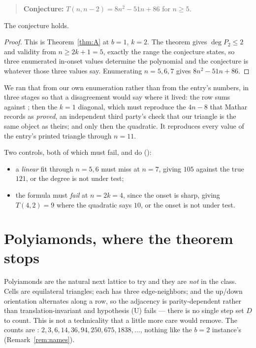 \documentclass[11pt]{article}
\begin{document}
\begin{quote}
\textbf{Conjecture:} $T(n,n-2) = 8n^2 - 51n + 86$ for $n \ge 5$.
\end{quote}

\begin{corollary}
\label{cor:a308359}
The conjecture holds.
\end{corollary}

\begin{proof}
This is Theorem~\ref{thm:A} at $b = 1$, $k = 2$. The theorem gives
$\deg P_2 \le 2$ and validity from $n \ge 2k+1 = 5$, exactly the range the
conjecture states, so three enumerated in-onset values determine the
polynomial and the conjecture is whatever those three values say. Enumerating
$n = 5, 6, 7$ gives $8n^2 - 51n + 86$.
\end{proof}

We ran that from our own enumeration rather than from the entry's numbers, in
three stages so that a disagreement would say where it lived: the row sums
against ; then the $k=1$ diagonal, which must reproduce the
$4n-8$ that Mathar records as \emph{proved}, an independent third party's check
that our triangle is the same object as theirs; and only then the quadratic. It reproduces every value
of the entry's printed triangle through $n = 11$.

Two controls, both of which must fail, and do
():
\begin{itemize}
\item a \emph{linear} fit through $n = 5, 6$ must miss at $n = 7$, giving
  $105$ against the true $121$, or the degree is not under test;
\item the formula must \emph{fail} at $n = 2k = 4$, since the onset is sharp,
  giving $T(4,2) = 9$ where the quadratic says $10$, or the onset is not under
  test.
\end{itemize}

\section{Polyiamonds, where the theorem stops}
\label{sec:polyiamond}

Polyiamonds are the natural next lattice to try and they are \emph{not} in the
class. Cells are equilateral triangles; each has three edge-neighbors; and the
up/down orientation alternates along a row, so the adjacency is parity-dependent
rather than translation-invariant and hypothesis (U) fails --- there is no single
step set $D$ to count. This is not a technicality that a little more care would
remove. The counts are : $2, 3, 6, 14, 36, 94, 250, 675, 1838,
\dots$, nothing like the $b=2$ instance's 
(Remark~\ref{rem:names}).
\end{document}
